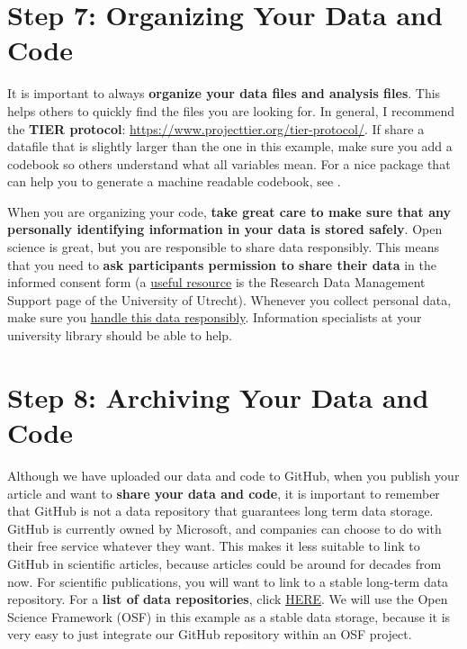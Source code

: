 \documentclass[
  oneside]{krantz}
\begin{document}
\hypertarget{step-7-organizing-your-data-and-code}{%
\section{Step 7: Organizing Your Data and Code}\label{step-7-organizing-your-data-and-code}}

It is important to always \textbf{organize your data files and analysis files}. This
helps others to quickly find the files you are looking for. In general, I
recommend the \textbf{TIER protocol}: \url{https://www.projecttier.org/tier-protocol/}.
If share a datafile that is slightly larger than the one in this example, make
sure you add a codebook so others understand what all variables mean. For a nice package that can help you to generate a machine readable codebook, see \citet{arslan_how_2019}.

When you are organizing your code, \textbf{take great care to make sure that any personally identifying information in your data is stored safely}. Open science is great, but you are responsible to share data responsibly. This means that you need to \textbf{ask participants permission to share their data} in the informed consent form (a \href{https://www.uu.nl/en/research/research-data-management/guides/informed-consent-for-data-sharing}{useful resource}
is the Research Data Management Support page of the University of Utrecht).
Whenever you collect personal data, make sure you \href{https://www.uu.nl/en/research/research-data-management/guides/handling-personal-data}{handle this data responsibly}. Information specialists at your university library should be able to help.

\hypertarget{step-8-archiving-your-data-and-code}{%
\section{Step 8: Archiving Your Data and Code}\label{step-8-archiving-your-data-and-code}}

Although we have uploaded our data and code to GitHub, when you publish your article and want to \textbf{share your data and code}, it is important to remember that GitHub is not a data repository that guarantees long term data storage.
GitHub is currently owned by Microsoft, and companies can choose to do with their free service whatever they want. This makes it less suitable to link to GitHub in scientific articles, because articles could be around for decades from now. For scientific publications, you will want to link to a stable long-term data repository. For a \textbf{list of data repositories}, click \href{http://journals.plos.org/plosone/s/data-availability\#loc-recommended-repositories}{HERE}.
We will use the Open Science Framework (OSF) in this example as a stable data storage, because it is very easy to just integrate our GitHub repository within an OSF project.
\end{document}
